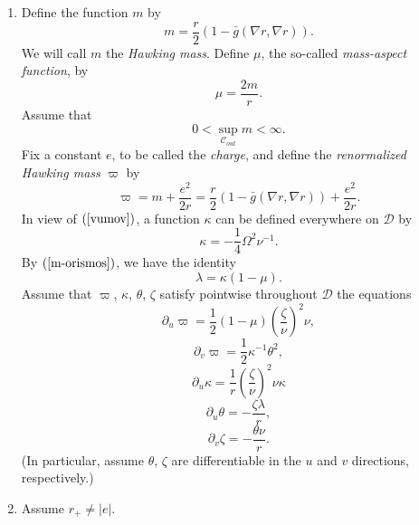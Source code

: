 \documentclass{article}
\newcommand{\zn}{\frac{\zeta}{\nu}}
\begin{document}
\begin{enumerate}
\item[${\bf E}'$.]
Define the function $m$
by
\begin{equation}
\label{m-orismos}
m=\frac{r}2(1-\bar{g}(\nabla r,\nabla r)).
\end{equation}
We will call $m$ the \emph{Hawking mass}.
Define $\mu$, the so-called \emph{mass-aspect function}, by
\begin{equation}
\label{ma-orismos}
\mu=\frac{2m}r.
\end{equation}
Assume that
\begin{equation}
\label{pepmaza}
0<\sup_{\mathcal{C}_{out}}m<\infty.
\end{equation}
Fix a constant $e$, to be called the \emph{charge}, and
define the 
\emph{renormalized Hawking mass} $\varpi$ by
\begin{equation}
\label{pi-orismos}
\varpi=m+\frac{e^2}{2r}=\frac{r}2(1-\bar{g}(\nabla r,\nabla r))+\frac{e^2}{2r}.
\end{equation}
In view of $(\ref{vumov})$, a
function $\kappa$ can be defined everywhere on $\mathcal{D}$
by
\begin{equation}
\label{kappaori}
\kappa=-\frac14\Omega^{2}\nu^{-1}.
\end{equation}
By $(\ref{m-orismos})$, we have the identity
\begin{equation}
\label{star}
\lambda=\kappa(1-\mu).
\end{equation}
Assume that $\varpi$, $\kappa$, $\theta$,
$\zeta$ satisfy pointwise throughout $\mathcal{D}$ the equations
\begin{equation}
\label{puqu}
\partial_u\varpi=\frac{1}{2}(1-\mu)\left(\zn\right)^2\nu,
\end{equation}
\begin{equation}
\label{pvqu}
\partial_v\varpi=
\frac{1}{2}\kappa^{-1}\theta^2,
\end{equation}
\begin{equation}
\label{fdb1}
\partial_u\kappa=\frac{1}r\left(\frac{\zeta}{\nu}\right)^2\nu\kappa
\end{equation}
\begin{equation}
\label{sign1}
\partial_u\theta=-\frac{\zeta\lambda}r,
\end{equation}
\begin{equation}
\label{sign2}
\partial_v\zeta=-\frac{\theta\nu}r.
\end{equation}
(In particular, assume $\theta$, $\zeta$ are differentiable
in the $u$ and $v$ directions, respectively.)
\item[${\bf \Sigma T}'$.]
Assume
$r_+\ne |e|$.
\end{enumerate}
\end{document}
